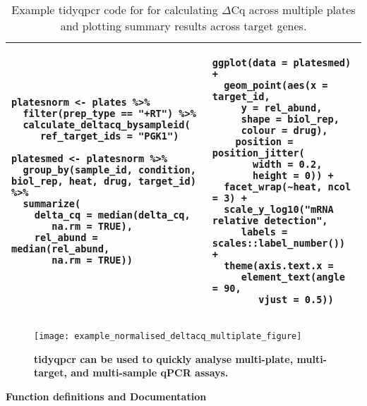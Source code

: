 \documentclass[../main.tex]{subfiles}
\begin{document}
\begin{table}
\centering
\begin{tabular}{| p{5.6cm}  p{5.6cm} |}
\hline
 \begin{lstlisting}[firstnumber=70, style=mystyle]
 platesnorm <- plates %>%
  filter(prep_type == "+RT") %>%
  calculate_deltacq_bysampleid(
     ref_target_ids = "PGK1")

platesmed <- platesnorm %>%
  group_by(sample_id, condition, biol_rep, heat, drug, target_id) %>%
  summarize(
    delta_cq = median(delta_cq,
       na.rm = TRUE),
    rel_abund = median(rel_abund,
       na.rm = TRUE))
 \end{lstlisting}& 
 \begin{lstlisting}[firstnumber=83, style=mystyle]
ggplot(data = platesmed) +
  geom_point(aes(x = target_id,
     y = rel_abund, 
     shape = biol_rep,
     colour = drug),
    position = position_jitter(
       width = 0.2,
       height = 0)) +
  facet_wrap(~heat, ncol = 3) +
  scale_y_log10("mRNA relative detection",
     labels = scales::label_number()) +
  theme(axis.text.x = 
     element_text(angle = 90,
        vjust = 0.5))
\end{lstlisting}   \\
\hline
\end{tabular}
\caption*{Example tidyqpcr code for for calculating $\Delta$Cq across multiple plates and plotting summary results across target genes.}
\label{calc-delta-cq}
\end{table}

\begin{figure}[t]

{\centering \texttt{[image: example\_normalised\_deltacq\_multiplate\_figure]}}

\caption[tidyqpcr can be used to quickly analyse multi-plate, multi-target, and multi-sample qPCR assays.]{\textbf{tidyqpcr can be used to quickly analyse multi-plate, multi-target, and multi-sample qPCR assays. }}\label{fig:tidyqpcr-multi-plate}
\end{figure}

\textbf{Function definitions and Documentation}
\end{document}
